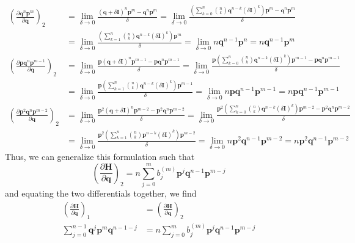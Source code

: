 \documentclass[a4paper]{article}
\theoremstyle{definition}
\begin{document}
		\begin{align}
			\left( \frac{\partial\textbf{q}^n\textbf{p}^m}{\partial\textbf{q}}\right)_2&=\lim_{\delta\to0}\frac{(\textbf{q}+\delta\textbf{I})^n\textbf{p}^m-\textbf{q}^n\textbf{p}^m}{\delta}=\lim_{\delta\to0}\frac{\left(	\displaystyle \sum_{k=0}^{n}\binom{n}{k}\textbf{q}^{n-k}(\delta\textbf{I})^k\right)\textbf{p}^m-\textbf{q}^n\textbf{p}^m}{\delta} \\
			&=\lim_{\delta\to0}\frac{\left(\displaystyle \sum_{k=1}^{n}\binom{n}{k}\textbf{q}^{n-k}(\delta\textbf{I})^k\right)\textbf{p}^m}{\delta}=\lim_{\delta\to0}n\textbf{q}^{n-1}\textbf{p}^n=n\textbf{q}^{n-1}\textbf{p}^m\\
			\left( \frac{\partial\textbf{p}\textbf{q}^n\textbf{p}^{m-1}}{\partial\textbf{q}}\right)_2&=\lim_{\delta\to0}\frac{\textbf{p}(\textbf{q}+\delta\textbf{I})^n\textbf{p}^{m-1}-\textbf{p}\textbf{q}^n\textbf{p}^{m-1}}{\delta}=\lim_{\delta\to0}\frac{\textbf{p}\left(	\displaystyle \sum_{k=0}^{n}\binom{n}{k}\textbf{q}^{n-k}(\delta\textbf{I})^k\right)\textbf{p}^{m-1}-\textbf{p}\textbf{q}^n\textbf{p}^{m-1}}{\delta} \\
			&=\lim_{\delta\to0}\frac{\textbf{p}\left(\displaystyle \sum_{k=1}^{n}\binom{n}{k}\textbf{q}^{n-k}(\delta\textbf{I})^k\right)\textbf{p}^{m-1}}{\delta}=\lim_{\delta\to0}n\textbf{p}\textbf{q}^{n-1}\textbf{p}^{m-1}=n\textbf{p}\textbf{q}^{n-1}\textbf{p}^{m-1} \\
			\left( \frac{\partial\textbf{p}^2\textbf{q}^n\textbf{p}^{m-2}}{\partial\textbf{q}}\right)_2&=\lim_{\delta\to0}\frac{\textbf{p}^2(\textbf{q}+\delta\textbf{I})^n\textbf{p}^{m-2}-\textbf{p}^2\textbf{q}^n\textbf{p}^{m-2}}{\delta}=\lim_{\delta\to0}\frac{\textbf{p}^2\left(	\displaystyle \sum_{k=0}^{n}\binom{n}{k}\textbf{q}^{n-k}(\delta\textbf{I})^k\right)\textbf{p}^{m-2}-\textbf{p}^2\textbf{q}^n\textbf{p}^{m-2}}{\delta} \\
			&=\lim_{\delta\to0}\frac{\textbf{p}^2\left(\displaystyle \sum_{k=1}^{n}\binom{n}{k}\textbf{p}^{n-k}(\delta\textbf{I})^k\right)\textbf{p}^{m-2}}{\delta}=\lim_{\delta\to0}n\textbf{p}^2\textbf{q}^{n-1}\textbf{p}^{m-2}=n\textbf{p}^2\textbf{q}^{n-1}\textbf{p}^{m-2}
		\end{align}
		Thus, we can generalize this formulation such that
		\begin{equation}
			\left( \frac{\partial\textbf{H}}{\partial\textbf{q}}\right)_2=n\sum_{j=0}^{m}b_j^{(m)}\textbf{p}^j\textbf{q}^{n-1}\textbf{p}^{m-j}
		\end{equation}
		and equating the two differentials together, we find
		\begin{align}
			\left( \frac{\partial\textbf{H}}{\partial\textbf{q}}\right)_1&=\left( \frac{\partial\textbf{H}}{\partial\textbf{q}}\right)_2\\
			\sum_{j=0}^{n-1}\textbf{q}^j\textbf{p}^m\textbf{q}^{n-1-j}&=n\sum_{j=0}^{m}b_j^{(m)}\textbf{p}^j\textbf{q}^{n-1}\textbf{p}^{m-j}\label{eqn:ref4}
		\end{align}
\end{document}
